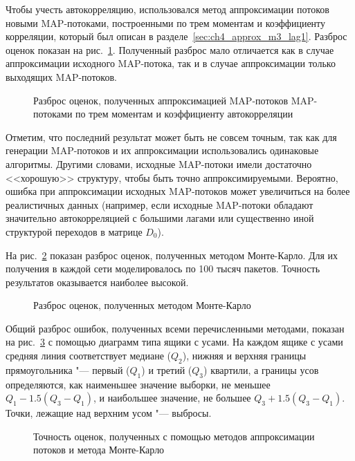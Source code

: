 Чтобы учесть автокорреляцию, использовался метод аппроксимации потоков новыми MAP-потоками, построенными по трем моментам и коэффициенту корреляции, который был описан в разделе~\ref{sec:ch4_approx_m3_lag1}. Разброс оценок показан на рис.~\ref{fig:ch4_scatter_map}. Полученный разброс мало отличается как в случае аппроксимации исходного MAP-потока, так и в случае аппроксимации только выходящих MAP-потоков.

\begin{figure}[h]
  \caption{Разброс оценок, полученных аппроксимацией MAP-потоков MAP-потоками по трем моментам и коэффициенту автокорреляции}
  \label{fig:ch4_scatter_map}
\end{figure}

Отметим, что последний результат может быть не совсем точным, так как для генерации MAP-потоков и их аппроксимации использовались одинаковые алгоритмы. Другими словами, исходные MAP-потоки имели достаточно <<хорошую>> структуру, чтобы быть точно аппроксимируемыми. Вероятно, ошибка при аппроксимации исходных MAP-потоков может увеличиться на более реалистичных данных (например, если исходные MAP-потоки обладают значительно автокорреляцией с большими лагами или существенно иной структурой переходов в матрице $D_0$).

На рис.~\ref{fig:ch4_scatter_monte_carlo} показан разброс оценок, полученных методом Монте-Карло. Для их получения в каждой сети моделировалось по 100 тысяч пакетов. Точность результатов оказывается наиболее высокой.

\begin{figure}[h]
  \caption{Разброс оценок, полученных методом Монте-Карло}
  \label{fig:ch4_scatter_monte_carlo}
\end{figure}

Общий разброс ошибок, полученных всеми перечисленными методами, показан на рис.~\ref{fig:ch4_approximations_summary} с помощью диаграмм типа ящики с усами. На каждом ящике с усами средняя линия соответствует медиане ($Q_2$), нижняя и верхняя границы прямоугольника "--- первый ($Q_1$) и третий ($Q_3$) квартили, а границы усов определяются, как наименьшее значение выборки, не меньшее $Q_1 - 1.5 (Q_3 - Q_1)$, и наибольшее значение, не большее $Q_3 + 1.5 (Q_3 - Q_1)$. Точки, лежащие над верхним усом "--- выбросы.

\begin{figure}[!h]
  \caption{Точность оценок, полученных с помощью методов аппроксимации потоков и метода Монте-Карло}
  \label{fig:ch4_approximations_summary}
\end{figure}

